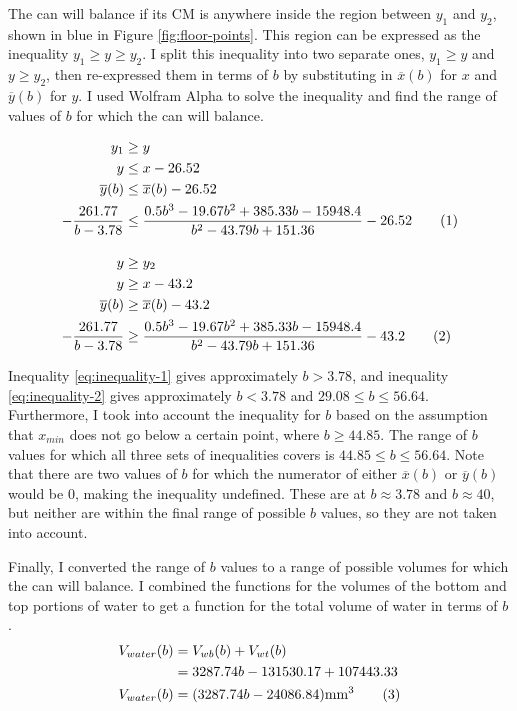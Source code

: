 \documentclass[11pt]{article}
\newcommand{\numberthis}{\addtocounter{equation}{1}\tag{\theequation}}
\begin{document}
    The can will balance if its CM is anywhere inside the region between $y_1$ and $y_2$, shown in blue in Figure \ref{fig:floor-points}. This region can be expressed as the inequality $y_1 \ge y \ge y_2$. I split this inequality into two separate ones, $y_1 \ge y$ and $y \ge y_2$, then re-expressed them in terms of $b$ by substituting in $\overline{x}(b)$ for $x$ and $\overline{y}(b)$ for $y$. I used Wolfram Alpha to solve the inequality and find the range of values of $b$ for which the can will balance.

    {\footnotesize\begin{align*}
        y_1 &\ge y \\
        y &\le x - 26.52 \\
        \overline{y}(b) &\le \overline{x}(b) - 26.52 \\
        -\frac{261.77}{b - 3.78} &\le \frac{0.5b^3 - 19.67b^2 + 385.33b - 15948.4}{b^2 - 43.79b + 151.36} - 26.52 \numberthis{\label{eq:inequality-1}} \\[10pt]
        y &\ge y_2 \\
        y &\ge x - 43.2 \\
        \overline{y}(b) &\ge \overline{x}(b) - 43.2 \\
        -\frac{261.77}{b - 3.78} &\ge \frac{0.5b^3 - 19.67b^2 + 385.33b - 15948.4}{b^2 - 43.79b + 151.36} - 43.2 \numberthis{\label{eq:inequality-2}}
    \end{align*}}

    Inequality \eqref{eq:inequality-1} gives approximately $b > 3.78$, and inequality \eqref{eq:inequality-2} gives approximately $b < 3.78$ and $29.08 \le b \le 56.64$. Furthermore, I took into account the inequality for $b$ based on the assumption that $x_{min}$ does not go below a certain point, where $b \ge 44.85$. The range of $b$ values for which all three sets of inequalities covers is $44.85 \le b \le 56.64$. Note that there are two values of $b$ for which the numerator of either $\overline{x}(b)$ or $\overline{y}(b)$ would be $0$, making the inequality undefined. These are at $b \approx 3.78$ and $b \approx 40$, but neither are within the final range of possible $b$ values, so they are not taken into account.

    Finally, I converted the range of $b$ values to a range of possible volumes for which the can will balance. I combined the functions for the volumes of the bottom and top portions of water to get a function for the total volume of water in terms of $b$.
    {\footnotesize\begin{align*}
        V_{water}(b) &= V_{wb}(b) + V_{wt}(b) \\
        &= 3287.74b - 131530.17 + 107443.33 \\
        V_{water}(b) &= (3287.74b - 24086.84) \mathrm{mm}^3 \numberthis{\label{eq:total-volume}}
    \end{align*}}
\end{document}
